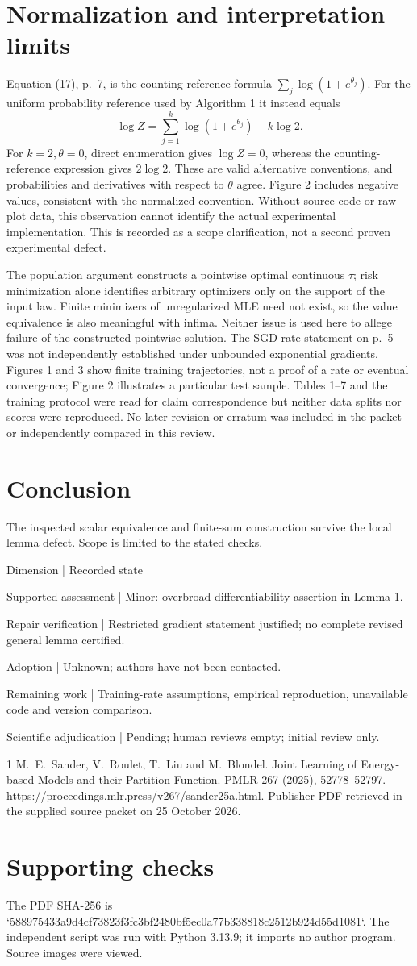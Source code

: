 \documentclass[10pt]{article}
\begin{document}
\section*{Normalization and interpretation limits}
Equation (17), p. 7, is the counting-reference formula \(\sum_j\log(1+e^{\theta_j})\). For the uniform probability reference used by Algorithm 1 it instead equals \[\log Z=\sum_{j=1}^k\log(1+e^{\theta_j})-k\log2.\] For \(k=2,\theta=0\), direct enumeration gives \(\log Z=0\), whereas the counting-reference expression gives \(2\log2\). These are valid alternative conventions, and probabilities and derivatives with respect to \(\theta\) agree. Figure 2 includes negative values, consistent with the normalized convention. Without source code or raw plot data, this observation cannot identify the actual experimental implementation. This is recorded as a scope clarification, not a second proven experimental defect.\par
The population argument constructs a pointwise optimal continuous \(\tau\); risk minimization alone identifies arbitrary optimizers only on the support of the input law. Finite minimizers of unregularized MLE need not exist, so the value equivalence is also meaningful with infima. Neither issue is used here to allege failure of the constructed pointwise solution. The SGD-rate statement on p. 5 was not independently established under unbounded exponential gradients. Figures 1 and 3 show finite training trajectories, not a proof of a rate or eventual convergence; Figure 2 illustrates a particular test sample. Tables 1–7 and the training protocol were read for claim correspondence but neither data splits nor scores were reproduced. No later revision or erratum was included in the packet or independently compared in this review.\par
\section*{Conclusion}
The inspected scalar equivalence and finite-sum construction survive the local lemma defect. Scope is limited to the stated checks.\par
Dimension | Recorded state\par
Supported assessment | Minor: overbroad differentiability assertion in Lemma 1.\par
Repair verification | Restricted gradient statement justified; no complete revised general lemma certified.\par
Adoption | Unknown; authors have not been contacted.\par
Remaining work | Training-rate assumptions, empirical reproduction, unavailable code and version comparison.\par
Scientific adjudication | Pending; human reviews empty; initial review only.\par
1 M. E. Sander, V. Roulet, T. Liu and M. Blondel. Joint Learning of Energy-based Models and their Partition Function. PMLR 267 (2025), 52778–52797. https://proceedings.mlr.press/v267/sander25a.html. Publisher PDF retrieved in the supplied source packet on 25 October 2026.\par
\section*{Supporting checks}
The PDF SHA-256 is `588975433a9d4cf73823f3fc3bf2480bf5ec0a77b338818c2512b924d55d1081`. The independent script was run with Python 3.13.9; it imports no author program. Source images were viewed.\par
\end{document}
